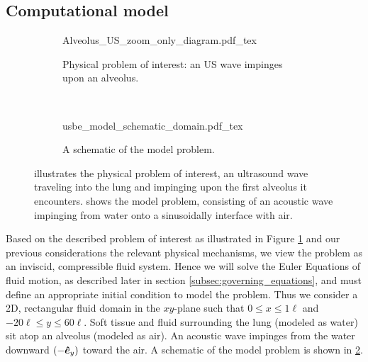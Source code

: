 \subsection{Computational model}
\label{subsec:setup}
%
\begin{figure}
  \centering
  \begin{subfigure}[b]{0.45\textwidth}
    \centering
    \def\svgwidth{\textwidth}
    {Alveolus_US_zoom_only_diagram.pdf_tex} \hfill%
    \caption{\label{fig:alveolar_schematic} Physical problem of interest: an \ac{US} wave impinges upon an alveolus.}
  \end{subfigure}
  ~
  \begin{subfigure}[b]{0.45\textwidth}
    \centering
    \def\svgwidth{\textwidth}
    {usbe_model_schematic_domain.pdf_tex} \hfill%
    \caption{\label{fig:problem_schematic} A schematic of the model problem.}
  \end{subfigure}
  \caption[A schematic view of the physical and model
  problems]{\protect{} illustrates the
    physical problem of interest, an ultrasound wave traveling into
    the lung and impinging upon the first alveolus it
    encounters.  shows the model
    problem, consisting of an acoustic wave impinging from water onto
    a sinusoidally interface with air.}
  \label{fig:schematics}
\end{figure}
% 
Based on the described problem of interest as illustrated in Figure
\ref{fig:alveolar_schematic} and our previous considerations the
relevant physical mechanisms, we view the problem as an inviscid,
compressible fluid system. Hence we will solve the Euler Equations of
fluid motion, as described later in section
\ref{subsec:governing_equations}, and must define an appropriate
initial condition to model the problem. Thus we consider a 2D,
rectangular fluid domain in the $xy$-plane such that
$0\leq x\leq 1\ell$ and $-20\ell\leq y\leq 60\ell$. Soft tissue and
fluid surrounding the lung (modeled as water) sit atop an alveolus
(modeled as air). An acoustic wave impinges from the water downward
$(-\boldsymbol{\hat{e}}_y)$ toward the air. A schematic of the model problem
is shown in \ref{fig:problem_schematic}.

